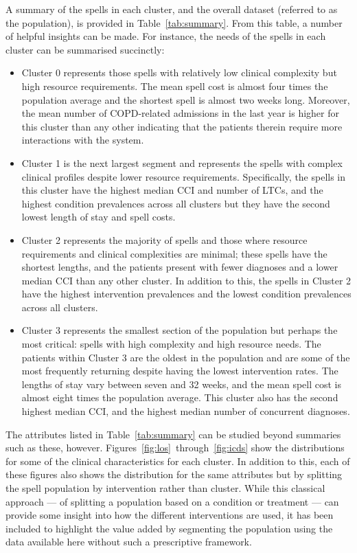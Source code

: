 A summary of the spells in each cluster, and the overall dataset (referred to as
the population), is provided in Table~\ref{tab:summary}. From this table, a
number of helpful insights can be made. For instance, the needs of the spells in
each cluster can be summarised succinctly:
\begin{itemize}
    \item Cluster 0 represents those spells with relatively low clinical
        complexity but high resource requirements. The mean spell cost is almost
        four times the population average and the shortest spell is almost two
        weeks long. Moreover, the mean number of COPD-related admissions in the
        last year is higher for this cluster than any other indicating that the
        patients therein require more interactions with the system.
    \item Cluster 1 is the next largest segment and represents the spells with
        complex clinical profiles despite lower resource requirements.
        Specifically, the spells in this cluster have the highest median CCI and
        number of LTCs, and the highest condition prevalences across all
        clusters but they have the second lowest length of stay and spell costs.
    \item Cluster 2 represents the majority of spells and those where resource
        requirements and clinical complexities are minimal; these spells have
        the shortest lengths, and the patients present with fewer diagnoses and
        a lower median CCI than any other cluster. In addition to this, the
        spells in Cluster 2 have the highest intervention prevalences and the
        lowest condition prevalences across all clusters.
    \item Cluster 3 represents the smallest section of the population but
        perhaps the most critical: spells with high complexity and high resource
        needs. The patients within Cluster 3 are the oldest in the population
        and are some of the most frequently returning despite having the lowest
        intervention rates. The lengths of stay vary between seven and 32 weeks,
        and the mean spell cost is almost eight times the population average.
        This cluster also has the second highest median CCI, and the highest
        median number of concurrent diagnoses.
\end{itemize}

The attributes listed in Table~\ref{tab:summary} can be studied beyond summaries
such as these, however. Figures~\ref{fig:los}~through~\ref{fig:icds} show
the distributions for some of the clinical characteristics for each cluster. In
addition to this, each of these figures also shows the distribution for the same
attributes but by splitting the spell population by intervention rather than
cluster. While this classical approach --- of splitting a population based on a
condition or treatment --- can provide some insight into how the different
interventions are used, it has been included to highlight the value added by
segmenting the population using the data available here without such a
prescriptive framework.

